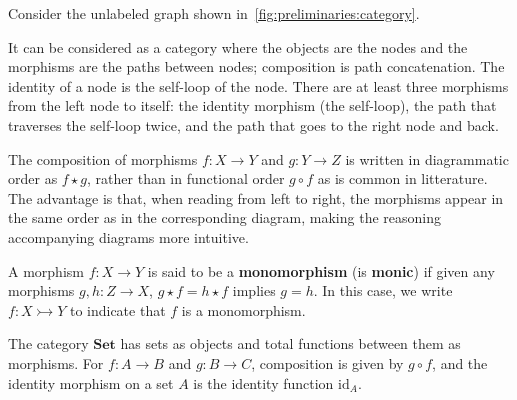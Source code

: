 \begin{example}
    Consider the unlabeled graph shown in~\autoref{fig:preliminaries:category}. 
        \begin{figure}[H]
        \centering
        \caption{}
        \label{fig:preliminaries:category}
    \end{figure}
    It can be considered as a category where the objects are the nodes and the morphisms are the paths between nodes; composition is path concatenation. The identity of a node is the self-loop of the node. There are at least three morphisms from the left node to itself: the identity morphism (the self-loop), the path that traverses the self-loop twice, and the path that goes to the right node and back.
\end{example}

\begin{notation}
    The composition of morphisms \( f : X \to Y \) and \( g : Y \to Z \) is written in diagrammatic order as \( f \star g \), rather than in functional order \( g \circ f \) as is common in litterature. The advantage is that, when reading from left to right, the morphisms appear in the same order as in the corresponding diagram, making the reasoning accompanying diagrams more intuitive. 
\end{notation}  

\begin{definition} 
    \label{def:cat:homo}
    A morphism \( f : X \to Y \) is said to be a \textbf{monomorphism} (is \textbf{monic}) if given any morphisms \( g,h: Z \to X  \), \( g \star f = h \star f \) implies \( g = h \). 
    In this case, we write $f : X \rightarrowtail Y$ to indicate that $f$ is a monomorphism.
\end{definition} 

\begin{example}
The category \(\mathbf{Set}\) has sets as objects and total functions between them as morphisms. For \(f\colon A\to B\) and \(g\colon B\to C\), composition is given by \(g\circ f\), and the identity morphism on a set \(A\) is the identity function \(\mathrm{id}_A\).
\end{example}

